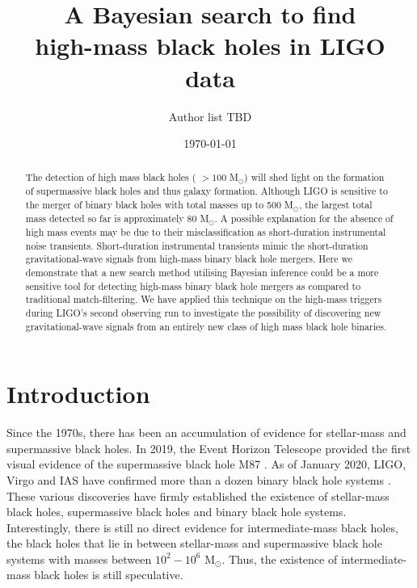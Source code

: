 \documentclass[%
 reprint,
 amsmath,amssymb,
 aps,
]{revtex4}
\newcommand{\msun}{{M${}_\odot$}\xspace}
\begin{document}

\title{A Bayesian search to find \\high-mass black holes in  LIGO data}%


\author{Author list TBD}

\date{\today}

\begin{abstract}
The detection of high mass black holes ( $>100$ \msun) will shed light on the formation of supermassive black holes and thus galaxy formation. Although LIGO is sensitive to the merger of binary black holes with total masses up to 500 \msun, the largest total mass detected so far is approximately 80 \msun. A possible explanation for the absence of high mass events may be due to their misclassification as short-duration instrumental noise transients. Short-duration instrumental transients mimic the short-duration gravitational-wave signals from high-mass binary black hole mergers. Here we demonstrate that a new search method utilising Bayesian inference could be a more sensitive tool for detecting high-mass binary black hole mergers as compared to traditional match-filtering. We have applied this technique on the high-mass triggers during LIGO's second observing run to investigate the possibility of discovering new gravitational-wave signals from an entirely new class of high mass black hole binaries.


\end{abstract}

\maketitle



\section{\label{sec:Introduction}Introduction}

Since the 1970s, there has been an accumulation of evidence for stellar-mass and supermassive black holes. In 2019, the Event Horizon Telescope provided the first visual evidence of the supermassive black hole M87  \cite{m87photo}.  As of January 2020, LIGO, Virgo and IAS have confirmed more than a dozen binary black hole systems \cite{GWTC1, IAS0, IAS1, IAS2}. These various discoveries have firmly established the existence of stellar-mass black holes, supermassive black holes and binary black hole systems.  Interestingly, there is still no direct evidence for intermediate-mass black holes, the black holes that lie in between stellar-mass and supermassive black hole systems with masses between $10^2-10^6$ \msun. Thus, the existence of intermediate-mass black holes is still speculative. \\
\end{document}
